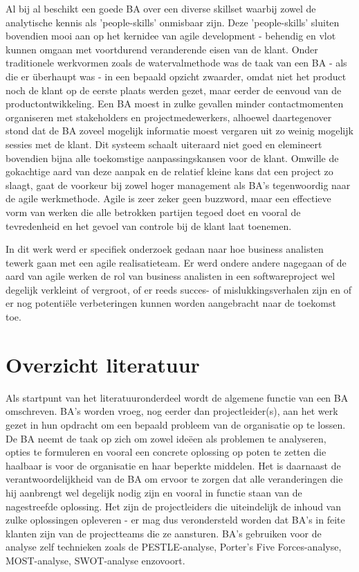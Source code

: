 \documentclass{hogent-article}
\begin{document}
Al bij al beschikt een goede BA over een diverse skillset waarbij zowel de analytische
kennis als 'people-skills' onmisbaar zijn. Deze 'people-skills' sluiten bovendien mooi aan op 
het kernidee van agile development - behendig en vlot kunnen omgaan met voortdurend
veranderende eisen van de klant. Onder traditionele werkvormen zoals de watervalmethode was 
de taak van een BA - als die er überhaupt was - in een bepaald opzicht zwaarder, omdat niet 
het product noch de klant op de eerste plaats werden gezet, maar eerder de eenvoud van de
productontwikkeling. Een BA moest in zulke gevallen minder contactmomenten organiseren met 
stakeholders en projectmedewerkers, alhoewel daartegenover stond dat de BA zoveel mogelijk 
informatie moest vergaren uit zo weinig mogelijk sessies met de klant. Dit systeem schaalt 
uiteraard niet goed en elemineert bovendien bijna alle toekomstige aanpassingskansen voor 
de klant. Omwille de gokachtige aard van deze aanpak en de relatief kleine kans dat 
een project zo slaagt, gaat de voorkeur bij zowel hoger management als BA's tegenwoordig naar 
de agile werkmethode. Agile is zeer zeker geen buzzword, maar een effectieve vorm van werken 
die alle betrokken partijen tegoed doet en vooral de tevredenheid en het gevoel van controle 
bij de klant laat toenemen.

In dit werk werd er specifiek onderzoek gedaan naar hoe business analisten tewerk gaan met 
een agile realisatieteam. Er werd ondere andere nagegaan of de aard van agile werken de rol 
van business analisten in een softwareproject wel degelijk verkleint of vergroot, of er reeds 
succes- of mislukkingsverhalen zijn en of er nog potentiële verbeteringen kunnen worden 
aangebracht naar de toekomst toe.

\section{Overzicht literatuur}

Als startpunt van het literatuuronderdeel wordt de algemene functie van een BA omschreven.
BA's worden vroeg, nog eerder dan projectleider(s), aan het werk gezet in hun opdracht om een 
bepaald probleem van de organisatie op te lossen. De BA neemt de taak op zich om zowel ideëen 
als problemen te analyseren, opties te formuleren en vooral een concrete oplossing op poten 
te zetten die haalbaar is voor de organisatie en haar beperkte middelen. Het is daarnaast 
de verantwoordelijkheid van de BA om ervoor te zorgen dat alle veranderingen die hij aanbrengt 
wel degelijk nodig zijn en vooral in functie staan van de nagestreefde oplossing. Het zijn de 
projectleiders die uiteindelijk de inhoud van zulke oplossingen opleveren - er mag dus 
verondersteld worden dat BA's in feite klanten zijn van de projectteams die ze aansturen. 
BA's gebruiken voor de analyse zelf technieken zoals de PESTLE-analyse, Porter's Five 
Forces-analyse, MOST-analyse, SWOT-analyse enzovoort. \autocite{72tools}
\end{document}
